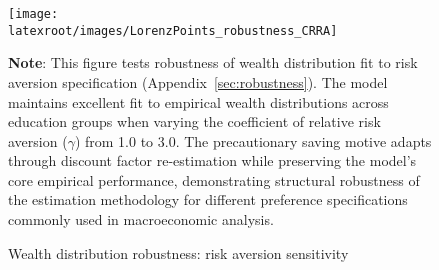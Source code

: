 \documentclass{econsocart}
\begin{document}
\begin{figure}[htb] 
  \centering
  \caption{Wealth distribution robustness: risk aversion sensitivity}
  \label{fig:LorenzPts_robustness_CRRA} 
  \texttt{[image: \\latexroot/images/LorenzPoints\_robustness\_CRRA]}

  \medskip
  \noindent\parbox{\textwidth}{\footnotesize
    \textbf{Note}: This figure tests robustness of wealth distribution fit to risk aversion specification
    (Appendix~\ref{sec:robustness}).
    The model maintains excellent fit to empirical wealth distributions across education groups
    when varying the coefficient of relative risk aversion ($\gamma$) from 1.0 to 3.0.
    The precautionary saving motive adapts through discount factor re-estimation while preserving
    the model's core empirical performance, demonstrating structural robustness of the estimation
    methodology for different preference specifications commonly used in macroeconomic analysis.
  }
\end{figure}

\vspace{0.5em}
\end{document}

